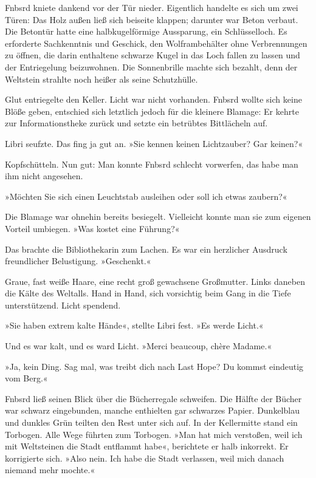 Fnbsrd kniete dankend vor der Tür nieder. Eigentlich handelte es sich um zwei Türen: Das Holz außen ließ sich beiseite klappen; darunter war Beton verbaut. Die Betontür hatte eine halbkugelförmige Aussparung, ein Schlüsselloch. Es erforderte Sachkenntnis und Geschick, den Wolframbehälter ohne Verbrennungen zu öffnen, die darin enthaltene schwarze Kugel in das Loch fallen zu lassen und der Entriegelung beizuwohnen. Die Sonnenbrille machte sich bezahlt, denn der Weltstein strahlte noch heißer als seine Schutzhülle.

Glut entriegelte den Keller. Licht war nicht vorhanden. Fnbsrd wollte sich keine Blöße geben, entschied sich letztlich jedoch für die kleinere Blamage: Er kehrte zur Informationstheke zurück und setzte ein betrübtes Bittlächeln auf.

Libri seufzte. Das fing ja gut an. »Sie kennen keinen Lichtzauber? Gar keinen?«

Kopfschütteln. Nun gut: Man konnte Fnbsrd schlecht vorwerfen, das habe man ihm nicht angesehen.

»Möchten Sie sich einen Leuchtstab ausleihen oder soll ich etwas zaubern?«

Die Blamage war ohnehin bereits besiegelt. Vielleicht konnte man sie zum eigenen Vorteil umbiegen. »Was kostet eine Führung?«

Das brachte die Bibliothekarin zum Lachen. Es war ein herzlicher Ausdruck freundlicher Belustigung. »Geschenkt.«

Graue, fast weiße Haare, eine recht groß gewachsene Großmutter. Links daneben die Kälte des Weltalls. Hand in Hand, sich vorsichtig beim Gang in die Tiefe unterstützend. Licht spendend.

»Sie haben extrem kalte Hände«, stellte Libri fest. »Es werde Licht.«

Und es war kalt, und es ward Licht. »Merci beaucoup, chère Madame.«

»Ja, kein Ding. Sag mal, was treibt dich nach Last Hope? Du kommst eindeutig vom Berg.«

Fnbsrd ließ seinen Blick über die Bücherregale schweifen. Die Hälfte der Bücher war schwarz eingebunden, manche enthielten gar schwarzes Papier. Dunkelblau und dunkles Grün teilten den Rest unter sich auf. In der Kellermitte stand ein Torbogen. Alle Wege führten zum Torbogen. »Man hat mich verstoßen, weil ich mit Weltsteinen die Stadt entflammt habe«, berichtete er halb inkorrekt. Er korrigierte sich. »Also nein. Ich habe die Stadt verlassen, weil mich danach niemand mehr mochte.«

